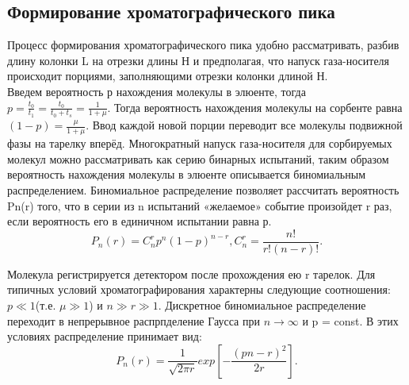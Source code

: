 \documentclass[12pt]{article}
\begin{document}
\begin{flushleft}
\subsection{Формирование хроматографического пика}
Процесс формирования
хроматографического пика удобно рассматривать, разбив
длину колонки L на отрезки длины Н и предполагая, что напуск газа-носителя
происходит порциями, заполняющими отрезки колонки длиной Н.\\
Введем вероятность р нахождения молекулы в элюенте, тогда $p = \frac{t_0}{t_1} = \frac{t_0}{t_0 + t_s} = \frac{1}{1 + \mu}$. Тогда вероятность нахождения молекулы на сорбенте равна $(1 - p) = \frac{\mu}{1 + \mu}$. Ввод каждой новой порции переводит все молекулы подвижной фазы на тарелку вперёд. Многократный напуск газа-носителя для сорбируемых молекул можно рассматривать как серию бинарных испытаний, таким образом вероятность нахождения молекулы в элюенте описывается биномиальным распределением. Биномиальное распределение позволяет рассчитать
вероятность Pn(r) того, что в серии из n испытаний «желаемое» событие произойдет r раз,
если вероятность его в единичном испытании равна р. 
\begin{equation}
P_n(r) = C_n^rp^n(1 - p)^{n-r},      C^r_n = \frac{n!}{r!(n - r)!}.
\end{equation}

	Молекула регистрируется детектором после прохождения ею r тарелок. Для типичных условий хроматографирования характерны следующие соотношения: $p \ll 1$(т.е. $\mu \gg 1$) и $n \gg r \gg 1$. Дискретное биномиальное распределение переходит в непрерывное распрпделение Гаусса при $n \rightarrow \infty$ и p = const. В этих условиях распределение принимает вид:
\begin{equation}
P_n(r) = \frac{1}{\sqrt{2\pi r}}exp\left[-\frac{(pn - r)^2}{2r}\right].
\end{equation}


\end{flushleft}
\end{document}
